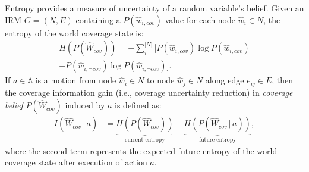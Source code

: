 \documentclass[letterpaper]{article} %
\newcommand{\ph}[1]{{\textbf{#1}:}} %
\begin{document}
\noindent
Entropy provides a measure of uncertainty of a random variable's belief. Given an IRM $G = (N, E)$ containing a $P(\hat{w}_{i,cov})$ value for each node $\hat{w}_i \in N$, the entropy of the world coverage state is:
\begin{multline}
  H(P(\hat{W}_{cov})) = - \sum_{i}^{|N|}\Big[ P(\hat{w}_{i,cov}) \log P(\hat{w}_{i,cov}) \\ 
  + P(\hat{w}_{i,\neg cov}) \log P(\hat{w}_{i,\neg cov}) \Big].
\end{multline}
If $a \in \mathbb{A}$ is a motion from node $\hat{w}_i \in N$ to node $\hat{w}_j \in N$ along edge $e_{ij} \in E$, then the coverage information gain (i.e., coverage uncertainty reduction) in \textit{coverage belief} $P(\hat{W}_{cov})$ induced by $a$ is defined as:
\begin{align}
    I(\hat{W}_{cov} \, | \, a) &= \underbrace{H(P(\hat{W}_{cov}))}_\text{current entropy} - \underbrace{H(P(\hat{W}_{cov}\, | \, a))}_\text{future entropy},
\end{align}
where the second term represents the expected future entropy of the world coverage state after execution of action $a$. 
\end{document}
